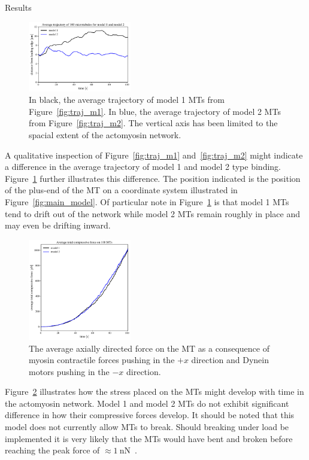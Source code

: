 \documentclass{beamer}
\newlength{\colwidth}
\begin{document}
\begin{frame}[t]
\begin{columns}[t]
\begin{column}{\colwidth}
\begin{block}{Results}
\begin{figure}
    \centering
    \includegraphics[width=0.4\textwidth]{../.figures/mt_trajectory_average_closeup.pdf}
    \caption{\label{fig:traj_comp}
        In black, the average trajectory of model 1 MTs from Figure~\ref{fig:traj_m1}. In blue, the average trajectory of model 2 MTs from Figure~\ref{fig:traj_m2}. The vertical axis has been limited to the spacial extent of the actomyosin network.
    }
\end{figure}

A qualitative inspection of Figure~\ref{fig:traj_m1} and~\ref{fig:traj_m2} might indicate a difference in the average trajectory of model 1 and model 2 type binding. Figure~\ref{fig:traj_comp} further illustrates this difference. The position indicated is the position of the plus-end of the MT on a coordinate system illustrated in Figure~\ref{fig:main_model}. Of particular note in Figure~\ref{fig:traj_comp} is that model 1 MTs tend to drift out of the network while model 2 MTs remain roughly in place and may even be drifting inward.

\begin{figure}
    \centering
    \includegraphics[width=0.4\textwidth]{../.figures/average_compressive_force.pdf}
    \caption{\label{fig:comp_force}
        The average axially directed force on the MT as a consequence of myosin contractile forces pushing in the \(+x\) direction and Dynein motors pushing in the \(-x\) direction.
    }
\end{figure}

Figure~\ref{fig:comp_force} illustrates how the stress placed on the MTs might develop with time in the actomyosin network. Model 1 and model 2 MTs do not exhibit significant difference in how their compressive forces develop. It should be noted that this model does not currently allow MTs to break. Should breaking under load be implemented it is very likely that the MTs would have bent and broken before reaching the peak force of \(\approx \qty{1}{\nano\newton}\)~\cite{takasone_flexural_2002}.


\end{block}
\end{column}
\end{columns}
\end{frame}
\end{document}
